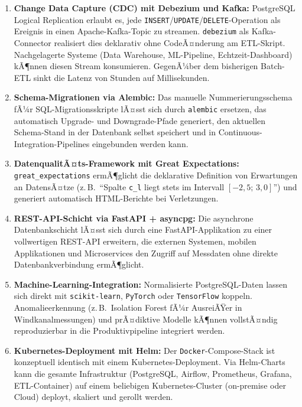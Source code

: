 ﻿\documentclass[12pt,a4paper]{report}
\theoremstyle{definition}
\theoremstyle{remark}
\newcommand{\docker}{\texttt{Docker}}
\newcommand{\code}[1]{\texttt{#1}}
\begin{document}
\begin{enumerate}[leftmargin=1.5em, itemsep=4pt]
  \item \textbf{Change Data Capture (CDC) mit Debezium und Kafka:}
        PostgreSQL Logical Replication erlaubt es, jede
        \code{INSERT}/\code{UPDATE}/\code{DELETE}-Operation als Ereignis
        in einen Apache-Kafka-Topic zu streamen. \code{debezium} als
        Kafka-Connector realisiert dies deklarativ ohne CodeÃ¤nderung
        am ETL-Skript. Nachgelagerte Systeme (Data Warehouse,
        ML-Pipeline, Echtzeit-Dashboard) kÃ¶nnen diesen Stream
        konsumieren. GegenÃ¼ber dem bisherigen Batch-ETL sinkt die
        Latenz von Stunden auf Millisekunden.

  \item \textbf{Schema-Migrationen via Alembic:}
        Das manuelle Nummerierungsschema fÃ¼r SQL-Migrationsskripte
        lÃ¤sst sich durch \code{alembic} ersetzen, das automatisch
        Upgrade- und Downgrade-Pfade generiert, den aktuellen
        Schema-Stand in der Datenbank selbst speichert und in
        Continuous-Integration-Pipelines eingebunden werden kann.

  \item \textbf{DatenqualitÃ¤ts-Framework mit Great Expectations:}
        \code{great\_expectations} ermÃ¶glicht die deklarative Definition
        von Erwartungen an DatensÃ¤tze (z.\,B.\ ``Spalte \code{c\_l}
        liegt stets im Intervall $[-2{,}5;\, 3{,}0]$'') und generiert
        automatisch HTML-Berichte bei Verletzungen.

  \item \textbf{REST-API-Schicht via FastAPI + asyncpg:}
        Die asynchrone Datenbankschicht lÃ¤sst sich durch eine
        FastAPI-Applikation zu einer vollwertigen REST-API erweitern,
        die externen Systemen, mobilen Applikationen und Microservices
        den Zugriff auf Messdaten ohne direkte Datenbankverbindung
        ermÃ¶glicht.

  \item \textbf{Machine-Learning-Integration:}
        Normalisierte PostgreSQL-Daten lassen sich direkt mit
        \code{scikit-learn}, \code{PyTorch} oder \code{TensorFlow}
        koppeln. Anomalieerkennung (z.\,B.\ Isolation Forest fÃ¼r
        AusreiÃŸer in Windkanalmessungen) und prÃ¤diktive Modelle
        kÃ¶nnen vollstÃ¤ndig reproduzierbar in die Produktivpipeline
        integriert werden.

  \item \textbf{Kubernetes-Deployment mit Helm:}
        Der \docker-Compose-Stack ist konzeptuell identisch mit einem
        Kubernetes-Deployment. Via Helm-Charts kann die gesamte
        Infrastruktur (PostgreSQL, Airflow, Prometheus, Grafana,
        ETL-Container) auf einem beliebigen Kubernetes-Cluster
        (on-premise oder Cloud) deployt, skaliert und gerollt werden.
\end{enumerate}
\end{document}
